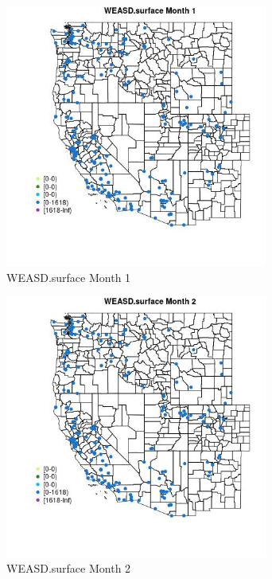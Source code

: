 \begin{figure} 
\centering  
\includegraphics[width=0.77\textwidth]{Code_Outputs/Report_ML_input_PM25_Step4_part_e_de_duplicated_aveswNAs_MapObsMo1WEASDsurface.jpg} 
\caption{\label{fig:Report_ML_input_PM25_Step4_part_e_de_duplicated_aveswNAsMapObsMo1WEASDsurface}WEASD.surface Month 1} 
\end{figure} 
 

\begin{figure} 
\centering  
\includegraphics[width=0.77\textwidth]{Code_Outputs/Report_ML_input_PM25_Step4_part_e_de_duplicated_aveswNAs_MapObsMo2WEASDsurface.jpg} 
\caption{\label{fig:Report_ML_input_PM25_Step4_part_e_de_duplicated_aveswNAsMapObsMo2WEASDsurface}WEASD.surface Month 2} 
\end{figure} 
 

